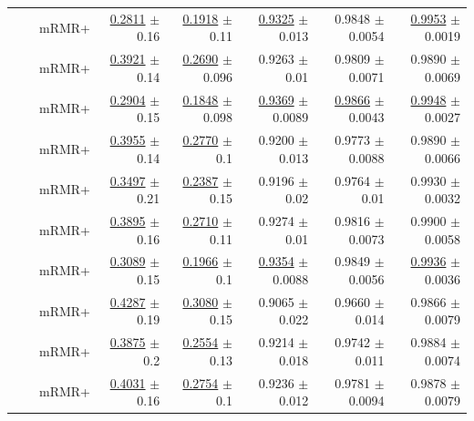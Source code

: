 \begin{longtable}{llp{}rrrrr}
 &  & mRMR+ & \underline{0.2811} {\scriptsize $\pm$ 0.16} & \underline{0.1918} {\scriptsize $\pm$ 0.11} & \underline{0.9325} {\scriptsize $\pm$ 0.013} & 0.9848 {\scriptsize $\pm$ 0.0054} & \underline{0.9953} {\scriptsize $\pm$ 0.0019} \\
 &  & mRMR+ & \underline{0.3921} {\scriptsize $\pm$ 0.14} & \underline{0.2690} {\scriptsize $\pm$ 0.096} & 0.9263 {\scriptsize $\pm$ 0.01} & 0.9809 {\scriptsize $\pm$ 0.0071} & 0.9890 {\scriptsize $\pm$ 0.0069} \\
 &  & mRMR+ & \underline{0.2904} {\scriptsize $\pm$ 0.15} & \underline{0.1848} {\scriptsize $\pm$ 0.098} & \underline{0.9369} {\scriptsize $\pm$ 0.0089} & \underline{0.9866} {\scriptsize $\pm$ 0.0043} & \underline{0.9948} {\scriptsize $\pm$ 0.0027} \\
 &  & mRMR+ & \underline{0.3955} {\scriptsize $\pm$ 0.14} & \underline{0.2770} {\scriptsize $\pm$ 0.1} & 0.9200 {\scriptsize $\pm$ 0.013} & 0.9773 {\scriptsize $\pm$ 0.0088} & 0.9890 {\scriptsize $\pm$ 0.0066} \\
 &  & mRMR+ & \underline{0.3497} {\scriptsize $\pm$ 0.21} & \underline{0.2387} {\scriptsize $\pm$ 0.15} & 0.9196 {\scriptsize $\pm$ 0.02} & 0.9764 {\scriptsize $\pm$ 0.01} & 0.9930 {\scriptsize $\pm$ 0.0032} \\
 &  & mRMR+ & \underline{0.3895} {\scriptsize $\pm$ 0.16} & \underline{0.2710} {\scriptsize $\pm$ 0.11} & 0.9274 {\scriptsize $\pm$ 0.01} & 0.9816 {\scriptsize $\pm$ 0.0073} & 0.9900 {\scriptsize $\pm$ 0.0058} \\
 &  & mRMR+ & \underline{0.3089} {\scriptsize $\pm$ 0.15} & \underline{0.1966} {\scriptsize $\pm$ 0.1} & \underline{0.9354} {\scriptsize $\pm$ 0.0088} & 0.9849 {\scriptsize $\pm$ 0.0056} & \underline{0.9936} {\scriptsize $\pm$ 0.0036} \\
 &  & mRMR+ & \underline{0.4287} {\scriptsize $\pm$ 0.19} & \underline{0.3080} {\scriptsize $\pm$ 0.15} & 0.9065 {\scriptsize $\pm$ 0.022} & 0.9660 {\scriptsize $\pm$ 0.014} & 0.9866 {\scriptsize $\pm$ 0.0079} \\
 &  & mRMR+ & \underline{0.3875} {\scriptsize $\pm$ 0.2} & \underline{0.2554} {\scriptsize $\pm$ 0.13} & 0.9214 {\scriptsize $\pm$ 0.018} & 0.9742 {\scriptsize $\pm$ 0.011} & 0.9884 {\scriptsize $\pm$ 0.0074} \\
 &  & mRMR+ & \underline{0.4031} {\scriptsize $\pm$ 0.16} & \underline{0.2754} {\scriptsize $\pm$ 0.1} & 0.9236 {\scriptsize $\pm$ 0.012} & 0.9781 {\scriptsize $\pm$ 0.0094} & 0.9878 {\scriptsize $\pm$ 0.0079} \\

\end{longtable}
